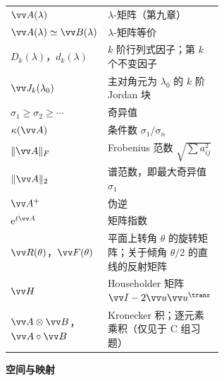 \begin{center}
\begin{longtable}{l>{\raggedright\arraybackslash}p{0.6\linewidth}}
		$\vv A(\lambda)$ & $\lambda$-矩阵（第九章） \\
		$\vv A(\lambda)\simeq\vv B(\lambda)$ & $\lambda$-矩阵等价 \\
		$D_k(\lambda)$，$d_k(\lambda)$ & $k$ 阶行列式因子；第 $k$ 个不变因子 \\
		$\vv J_k(\lambda_0)$ & 主对角元为 $\lambda_0$ 的 $k$ 阶 Jordan 块 \\
		$\sigma_1\ge\sigma_2\ge\cdots$ & 奇异值 \\
		$\kappa(\vv A)$ & 条件数 $\sigma_1/\sigma_n$ \\
		$\|\vv A\|_F$ & Frobenius 范数 $\sqrt{\sum a_{ij}^2}$ \\
				$\|\vv A\|_2$ & 谱范数，即最大奇异值 $\sigma_1$ \\
		$\vv A^+$ & 伪逆 \\
		$\mathrm e^{t\vv A}$ & 矩阵指数 \\
		$\vv R(\theta)$，$\vv F(\theta)$ & 平面上转角 $\theta$ 的旋转矩阵；关于倾角 $\theta/2$ 的直线的反射矩阵 \\
		$\vv H$ & Householder 矩阵 $\vv I-2\vv u\vv u^\trans$ \\
		$\vv A\otimes\vv B$，$\vv A\circ\vv B$ & Kronecker 积；逐元素乘积（仅见于 C 组习题） \\
		\bottomrule
	\end{longtable}
\end{center}

\textbf{空间与映射}

